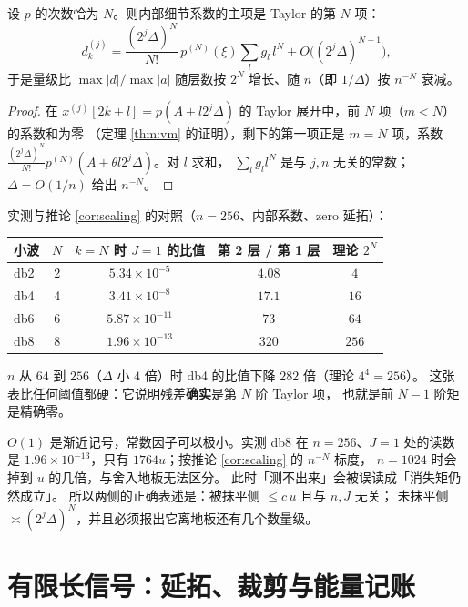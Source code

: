 \begin{corollary}[没被抹平那一侧的标度律]
\label{cor:scaling}
设 $p$ 的次数恰为 $N$。则内部细节系数的主项是 Taylor 的第 $N$ 项：
\[
d^{(j)}_k=\frac{(2^j\Delta)^N}{N!}\,p^{(N)}(\xi)\sum_lg_l\,l^N+O\big((2^j\Delta)^{N+1}\big),
\]
于是量级比 $\max|d|/\max|a|$ 随层数按 $2^N$ 增长、随 $n$（即 $1/\Delta$）按 $n^{-N}$ 衰减。
\end{corollary}

\begin{proof}
在 $x^{(j)}[2k+l]=p(A+l2^j\Delta)$ 的 Taylor 展开中，前 $N$ 项（$m<N$）的系数和为零
（定理 \ref{thm:vm} 的证明），剩下的第一项正是 $m=N$ 项，系数
$\frac{(2^j\Delta)^N}{N!}p^{(N)}(A+\theta l2^j\Delta)$。对 $l$ 求和，
$\sum_lg_ll^N$ 是与 $j,n$ 无关的常数；$\Delta=O(1/n)$ 给出 $n^{-N}$。
\end{proof}

实测与推论 \ref{cor:scaling} 的对照（$n=256$、内部系数、zero 延拓）：
\begin{center}
\begin{tabular}{lcccc}
\toprule
小波 & $N$ & $k=N$ 时 $J=1$ 的比值 & 第 2 层 / 第 1 层 & 理论 $2^N$\\
\midrule
db2 & 2 & $5.34\times10^{-5}$ & $4.08$ & $4$\\
db4 & 4 & $3.41\times10^{-8}$ & $17.1$ & $16$\\
db6 & 6 & $5.87\times10^{-11}$ & $73$ & $64$\\
db8 & 8 & $1.96\times10^{-13}$ & $320$ & $256$\\
\bottomrule
\end{tabular}
\end{center}
$n$ 从 $64$ 到 $256$（$\Delta$ 小 $4$ 倍）时 db4 的比值下降 $282$ 倍（理论 $4^4=256$）。
这张表比任何阈值都硬：它说明残差\textbf{确实}是第 $N$ 阶 Taylor 项，
也就是前 $N-1$ 阶矩是精确零。

\begin{remark}
\label{rem:vm-lie}
$O(1)$ 是渐近记号，常数因子可以极小。实测 db8 在 $n=256$、$J=1$ 处的读数是
$1.96\times10^{-13}$，只有 $1764u$；按推论 \ref{cor:scaling} 的 $n^{-N}$ 标度，
$n=1024$ 时会掉到 $u$ 的几倍，与舍入地板无法区分。
此时「测不出来」会被误读成「消失矩仍然成立」。
所以两侧的正确表述是：被抹平侧 $\le c\,u$ 且与 $n,J$ 无关；
未抹平侧 $\asymp(2^j\Delta)^N$，并且必须报出它离地板还有几个数量级。
\end{remark}

\section{有限长信号：延拓、裁剪与能量记账}

